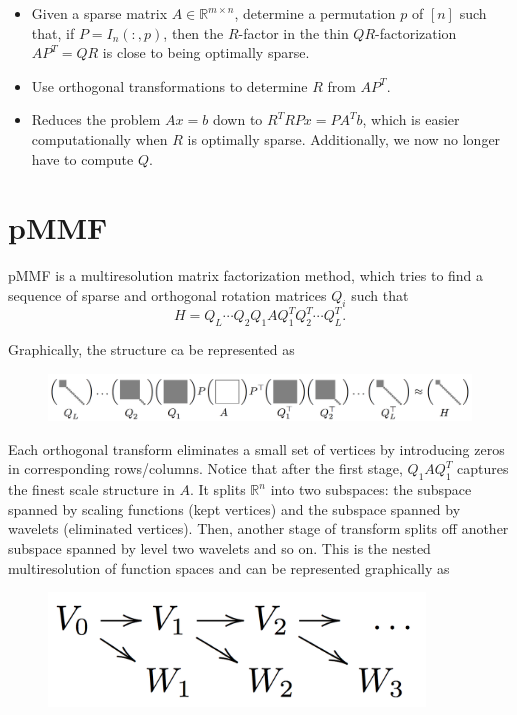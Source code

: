 \documentclass[a4paper]{article}
\newcommand{\R}{\mathbb{R}}
\begin{document}
\begin{itemize}
\item Given a sparse matrix $A \in \mathbb{R}^{m \times n}$, determine a permutation $p$ of $[n]$ such that, if $P = I_n(:,p)$, then the $R$-factor in the thin $QR$-factorization $AP^{T} = QR$ is close to being optimally sparse.
\item Use orthogonal transformations to determine $R$ from $AP^{T}$.
\item Reduces the problem $Ax = b$ down to $R^{T}RPx = PA^{T}b$, which is easier computationally when $R$ is optimally sparse. Additionally, we now no longer have to compute $Q$.
\end{itemize}

\section{pMMF}

pMMF is a multiresolution matrix factorization method, which tries to find a sequence of sparse and orthogonal rotation matrices $Q_i$ such that
$$H = Q_L \cdots Q_2 Q_1 A Q_1^T Q_2^T \cdots Q_L^T .$$

Graphically, the structure ca be represented as

\begin{figure}[H]
\centering
\includegraphics[width = 15cm]{pmmf/pmmf}
\end{figure}

Each orthogonal transform eliminates a small set of vertices by introducing zeros in corresponding rows/columns. Notice that after the first stage, $Q_1AQ_1^T$ captures the finest scale structure in $A$. It splits $\R^n$ into two subspaces: the subspace spanned by scaling functions (kept vertices) and the subspace spanned by wavelets (eliminated vertices). Then, another stage of transform splits off another subspace spanned by level two wavelets and so on. This is the nested multiresolution of function spaces and can be represented graphically as

\begin{figure}[H]
\centering
\includegraphics[width = 10cm]{pmmf/nestedspaces}
\end{figure}
\end{document}
